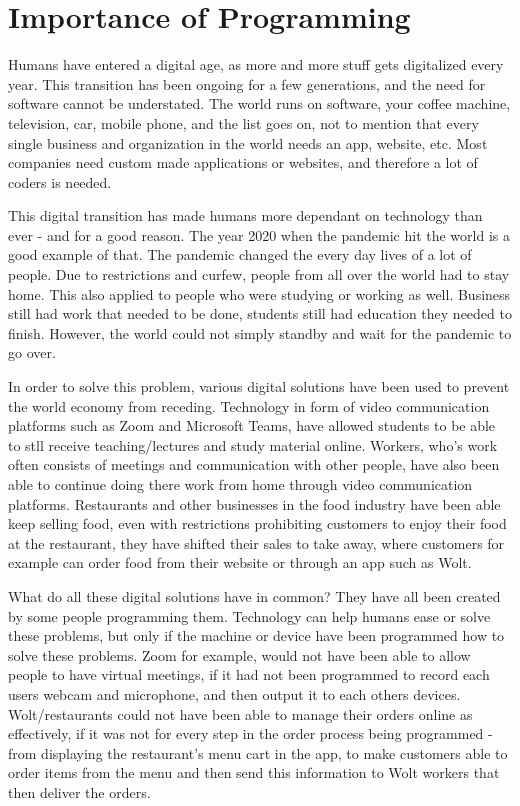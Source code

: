 \chapter{Importance of Programming} \label{chap:importance_of_programming}

Humans have entered a digital age, as more and more stuff gets 
digitalized every year. This transition has been ongoing for a few 
generations, and the need for software cannot be understated. The 
world runs on software, your coffee machine, television, car, mobile
phone, and the list goes on, not to mention that every single business 
and organization in the world needs an app, website, etc. Most companies
need custom made applications or websites, and therefore a lot of coders
is needed.

This digital transition has made humans more dependant on technology than ever - 
and for a good reason. The year 2020 when the pandemic hit the world is a good example of that.
The pandemic changed the every day lives of a lot of people. Due to restrictions and curfew,
people from all over the world had to stay home. This also applied to people 
who were studying or working as well. Business still had work that needed to be done,
students still had education they needed to finish. However, the world could not simply 
standby and wait for the pandemic to go over. 

In order to solve this problem,
various digital solutions have been used to prevent the world economy from receding.
Technology in form of video communication platforms such as Zoom and Microsoft Teams,
have allowed students to be able to stll receive teaching/lectures and study material online. 
Workers, who's work often consists of meetings and communication with other people,
have also been able to continue doing there work from home through video communication platforms. 
Restaurants and other businesses in the food industry have been able keep selling food, 
even with restrictions prohibiting customers to enjoy their food at the restaurant, 
they have shifted their sales to take away, where customers for example can order
food from their website or through an app such as Wolt. \newline


What do all these digital solutions have in common? They have all been created by 
some people programming them. Technology can help humans ease or solve these problems, 
but only if the machine or device have been programmed how to solve these problems. 
Zoom for example, would not have been able to allow people to have virtual meetings, 
if it had not been programmed to record each users webcam and microphone, and then output
it to each others devices. Wolt/restaurants could not have been able to manage
their orders online as effectively, if it was not for every step in the order process
being programmed - from displaying the restaurant's menu cart in the app, to make customers
able to order items from the menu and then send this information to Wolt workers that then 
deliver the orders. \newline

